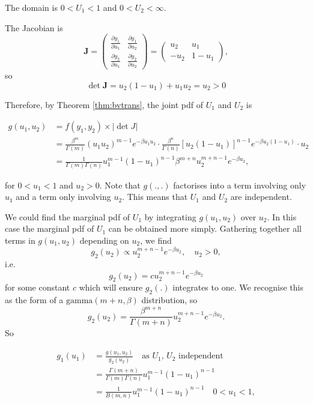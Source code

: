 \documentclass[]{book}
\theoremstyle{definition}
\theoremstyle{definition}
\theoremstyle{definition}
\theoremstyle{remark}
\begin{document}
The domain is \(0 < U_1 < 1\) and \(0 < U_2 < \infty\).

The Jacobian is \[ \bm J = 
\begin{pmatrix}
\frac{\partial y_1}{\partial u_1} & \frac{\partial y_1}{\partial u_2} \\
\frac{\partial y_2}{\partial u_1} & \frac{\partial y_2}{\partial u_2}
   \end{pmatrix}
   = \begin{pmatrix}
     u_2 & u_1 \\
     -u_2 & 1 - u_1
     \end{pmatrix},
\] so \[\det{\bm J} = u_2(1 - u_1) + u_1 u_2 = u_2 > 0\]

Therefore, by Theorem \ref{thm:bvtrans}, the joint pdf of \(U_1\) and
\(U_2\) is

\begin{align*}
g(u_1, u_2) &= f(y_1, y_2) \times \big |\det J \big| \\
&= \frac{\beta^m}{\Gamma(m)} (u_1 u_2)^{m-1} e^{-\beta u_1 u_2} \cdot
  \frac{\beta^n}{\Gamma(n)} \left[u_2(1 - u_1)\right]^{n-1} e^{-\beta u_2(1 - u_1)} 
  \cdot u_2 \\
&= \frac{1}{\Gamma(m)\Gamma(n)} u_1^{m-1} (1 - u_1)^{n-1} \beta^{m + n} u_2^{m + n - 1} e^{-\beta u_2},
\end{align*}

for \(0 < u_1 < 1\) and \(u_2 > 0\). Note that \(g(.,.)\) factorises
into a term involving only \(u_1\) and a term only involving \(u_2\).
This means that \(U_1\) and \(U_2\) are independent.

We could find the marginal pdf of \(U_1\) by integrating \(g(u_1, u_2)\)
over \(u_2\). In this case the marginal pdf of \(U_1\) can be obtained
more simply. Gathering together all terms in \(g(u_1, u_2)\) depending
on \(u_2\), we find
\[g_2(u_2) \propto u_2^{m + n - 1} e^{-\beta u_2}, \quad u_2 > 0,\] i.e.
\[g_2(u_2) = c u_2^{m + n - 1} e^{-\beta u_2}\] for some constant \(c\)
which will ensure \(g_2(.)\) integrates to one. We recognise this as the
form of a \(\text{gamma}(m + n, \beta)\) distribution, so
\[g_2(u_2) = \frac{\beta^{m+n}}{\Gamma(m + n)} u_2^{m + n - 1} e^{-\beta u_2}.\]
So

\begin{align*}
g_1(u_1) &= \frac{g(u_1, u_2)}{g_2(u_2)} \quad \text{as $U_1$, $U_2$ independent} \\
&= \frac{\Gamma(m + n)}{\Gamma(m) \Gamma(n)} u_1^{m-1} (1 - u_1)^{n-1} \\
&= \frac{1}{B(m, n)} u_1^{m-1} (1 - u_1)^{n-1} \quad 0 < u_1 < 1,
\end{align*}
\end{document}
